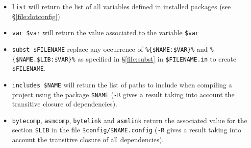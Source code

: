 \documentclass[a4paper,11pt]{article}
\begin{document}
\begin{itemize}
\item \verb+list+ will return the list of all variables defined
  in installed packages (see \S\ref{file:dotconfig})
\item \verb+var $var+ will return the value associated to the
  variable \verb+$var+
\item \verb+subst $FILENAME+ replace any occurrence of
  \verb+%{$NAME:$VAR}%+ and \verb+%{$NAME.$LIB:$VAR}%+ as specified in
  \S\ref{file:subst} in \verb+$FILENAME.in+ to create \verb+$FILENAME+.
\item \verb+includes $NAME+ will return the list of paths to include when
  compiling a project using the package \verb+$NAME+ (\verb+-R+ gives
  a result taking into account the transitive closure of
  dependencies).
\item \verb+bytecomp+, \verb+asmcomp+, \verb+bytelink+ and
  \verb+asmlink+ return the associated value for the section
  \verb+$LIB+ in the file \verb+$config/$NAME.config+ (\verb+-R+ gives
  a result taking into account the transitive closure of all
  dependencies).
\end{itemize}
\end{document}
